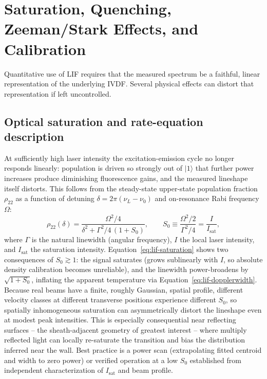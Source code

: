 \section{Saturation, Quenching, Zeeman/Stark Effects, and Calibration}

Quantitative use of LIF requires that the measured spectrum be a faithful, linear representation of the underlying IVDF. Several physical effects can distort that representation if left uncontrolled.

\subsection{Optical saturation and rate-equation description}

At sufficiently high laser intensity the excitation-emission cycle no longer responds linearly: population is driven so strongly out of $\lvert 1 \rangle$ that further power increases produce diminishing fluorescence gains, and the measured lineshape itself distorts. This follows from the steady-state upper-state population fraction $\rho_{22}$ as a function of detuning $\delta = 2\pi(\nu_{L}-\nu_{0})$ and on-resonance Rabi frequency $\Omega$:
\begin{equation}
\rho_{22}(\delta) = \frac{\Omega^{2}/4}{\delta^{2} + \Gamma^{2}/4\,(1+S_{0})} , \qquad S_{0} \equiv \frac{\Omega^{2}/2}{\Gamma^{2}/4} = \frac{I}{I_{\mathrm{sat}}},
\label{eq:lif-saturation}
\end{equation}
where $\Gamma$ is the natural linewidth (angular frequency), $I$ the local laser intensity, and $I_{\mathrm{sat}}$ the saturation intensity. Equation~\eqref{eq:lif-saturation} shows two consequences of $S_{0} \gtrsim 1$: the signal saturates (grows sublinearly with $I$, so absolute density calibration becomes unreliable), and the linewidth power-broadens by $\sqrt{1+S_{0}}$, inflating the apparent temperature via Equation~\eqref{eq:lif-dopplerwidth}. Because real beams have a finite, roughly Gaussian, spatial profile, different velocity classes at different transverse positions experience different $S_{0}$, so spatially inhomogeneous saturation can asymmetrically distort the lineshape even at modest peak intensities. This is especially consequential near reflecting surfaces -- the sheath-adjacent geometry of greatest interest -- where multiply reflected light can locally re-saturate the transition and bias the distribution inferred near the wall. Best practice is a power scan (extrapolating fitted centroid and width to zero power) or verified operation at a low $S_{0}$ established from independent characterization of $I_{\mathrm{sat}}$ and beam profile.

